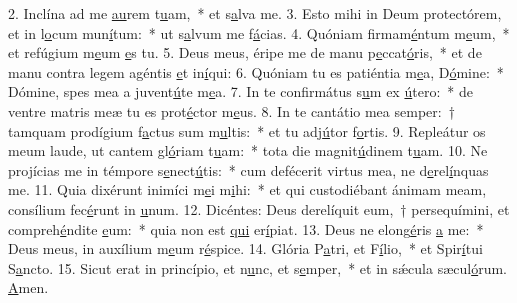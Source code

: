 2. Inclína ad me \uline{au}rem t\uline{u}am,~* et s\uline{a}lva me.
3. Esto mihi in Deum protectórem, et in l\uline{o}cum mun\uline{í}tum:~* ut s\uline{a}lvum me f\uline{á}cias.
4. Quóniam firmam\uline{é}ntum m\uline{e}um,~* et refúgium m\uline{e}um \uline{e}s tu.
5. Deus meus, éripe me de manu p\uline{e}ccat\uline{ó}ris,~* et de manu contra legem agéntis \uline{e}t in\uline{í}qui:
6. Quóniam tu es patiéntia m\uline{e}a, D\uline{ó}mine:~* Dómine, spes mea a juvent\uline{ú}te m\uline{e}a.
7. In te confirmátus s\uline{u}m ex \uline{ú}tero:~* de ventre matris meæ tu es prot\uline{é}ctor m\uline{e}us.
8. In te cantátio mea semper:~† tamquam prodígium f\uline{a}ctus sum m\uline{u}ltis:~* et tu adj\uline{ú}tor f\uline{o}rtis.
9. Repleátur os meum laude, ut cantem gl\uline{ó}riam t\uline{u}am:~* tota die magnit\uline{ú}dinem t\uline{u}am.
10. Ne projícias me in témpore s\uline{e}nect\uline{ú}tis:~* cum defécerit virtus mea, ne d\uline{e}rel\uline{í}nquas me.
11. Quia dixérunt inimíci m\uline{e}i m\uline{i}hi:~* et qui custodiébant ánimam meam, consílium fec\uline{é}runt in \uline{u}num.
12. Dicéntes: Deus derelíquit eum,~† persequímini, et compreh\uline{é}ndite \uline{e}um:~* quia non est \uline{qui} er\uline{í}piat.
13. Deus ne elong\uline{é}ris \uline{a} me:~* Deus meus, in auxílium m\uline{e}um r\uline{é}spice.
14. Glória P\uline{a}tri, et F\uline{í}lio,~* et Spir\uline{í}tui S\uline{a}ncto.
15. Sicut erat in princípio, et n\uline{u}nc, et s\uline{e}mper,~* et in sǽcula sæcul\uline{ó}rum. \uline{A}men.
